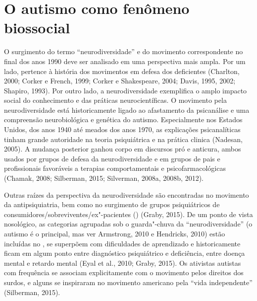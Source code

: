 \section{O autismo como fenômeno biossocial}

O surgimento do termo ``neurodiversidade'' e do movimento correspondente
no final dos anos 1990 deve ser analisado em uma perspectiva mais
ampla. Por um lado, pertence à história dos movimentos em defesa dos
deficientes (Charlton, 2000; Corker e French, 1999; Corker e
Shakespeare, 2004; Davis, 1995, 2002; Shapiro, 1993). Por outro lado, a
neurodiversidade exemplifica o amplo impacto social do conhecimento e
das práticas neurocientíficas. O
movimento pela neurodiversidade está historicamente ligado ao
afastamento da psicanálise e uma compreensão neurobiológica e
genética do autismo. Especialmente nos Estados Unidos, dos anos 1940 até
meados dos anos 1970, as explicações psicanalíticas tinham grande
autoridade na teoria psiquiátrica e na prática clinica (Nadesan, 2005).
A mudança posterior ganhou corpo em discursos pró e anticura, ambos
usados por grupos de defesa da neurodiversidade e em grupos de pais e
profissionais favoráveis a terapias comportamentais e
psicofarmacológicas (Chamak, 2008; Silberman, 2015; Silverman, 2008a,
2008b, 2012).

Outras raízes da perspectiva da neurodiversidade são encontradas no
movimento da antipsiquiatria, bem como no surgimento de grupos
psiquiátricos de consumidores/sobreviventes/ex"-pacientes () (Graby,
2015). De um ponto de vista nosológico, as categorias agrupadas sob o
guarda"-chuva da ``neurodiversidade'' (o autismo é o principal, mas ver
Armstrong, 2010 e Hendricks, 2010) estão incluídas no \emph{}, se
superpõem com dificuldades de aprendizado e historicamente ficam em
algum ponto entre diagnóstico psiquiátrico e deficiência, entre doença
mental e retardo mental (Eyal et al., 2010; Graby, 2015). Os ativistas
autistas com frequência se associam explicitamente com o movimento pelos
direitos dos surdos, e alguns se inspiraram no movimento americano pela
``vida independente'' (Silberman, 2015).


